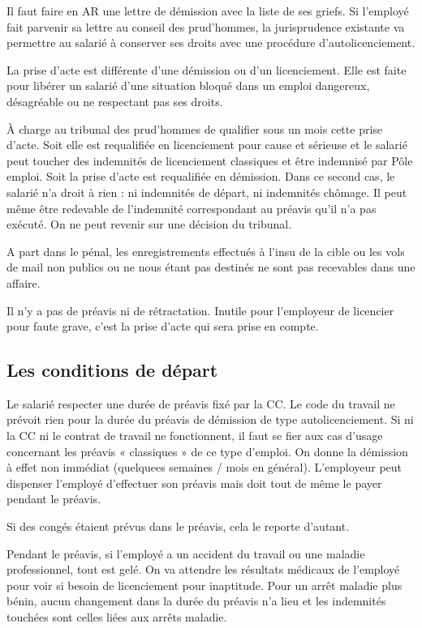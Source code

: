	Il faut faire en AR une lettre de démission avec la liste de ses griefs.
	Si l’employé fait parvenir sa lettre au conseil des prud’hommes, la jurisprudence existante va permettre au salarié à conserver ses droits avec une procédure d’autolicenciement.

	La prise d'acte est différente d'une démission ou d'un licenciement.
	Elle est faite pour libérer un salarié d’une situation bloqué dans un emploi dangereux, désagréable ou ne respectant pas ses droits.

	À charge au tribunal des prud’hommes de qualifier sous un mois cette prise d’acte.
	Soit elle est requalifiée en licenciement pour cause et sérieuse et le salarié peut toucher des indemnités de licenciement classiques et être indemnisé par Pôle emploi.
	Soit la prise d’acte est requalifiée en démission.
	Dans ce second cas, le salarié n’a droit à rien : ni indemnités de départ, ni indemnités chômage.
	Il peut même être redevable de l’indemnité correspondant au préavis qu’il n’a pas exécuté.
	On ne peut revenir sur une décision du tribunal.

	A part dans le pénal, les enregistrements effectués à l’insu de la cible ou les vols de mail non publics ou ne nous étant pas destinés ne sont pas recevables dans une affaire.

	Il n'y a pas de préavis ni de rétractation.
	Inutile pour l’employeur de licencier pour faute grave, c’est la prise d’acte qui sera prise en compte.

\subsection{Les conditions de départ}
	Le salarié respecter une durée de préavis fixé par la CC.
	Le code du travail ne prévoit rien pour la durée du préavis de démission de type autolicenciement.
	Si ni la CC ni le contrat de travail ne fonctionnent, il faut se fier aux cas d’usage concernant les préavis « classiques » de ce type d’emploi.
	On donne la démission à effet non immédiat (quelquees semaines / mois en général).
	L’employeur peut dispenser l’employé d’effectuer son préavis mais doit tout de même le payer pendant le préavis.

	Si des congés étaient prévus dans le préavis, cela le reporte d'autant.

	Pendant le préavis, si l’employé a un accident du travail ou une maladie professionnel, tout est gelé.
	On va attendre les résultats médicaux de l’employé pour voir si besoin de licenciement pour inaptitude.
	Pour un arrêt maladie plus bénin, aucun changement dans la durée du préavis n'a lieu et les indemnités touchées sont celles liées aux arrêts maladie.


